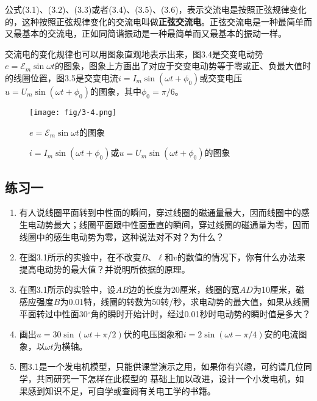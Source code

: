 公式(3.1)、(3.2)、(3.3)或者(3.4)、(3.5)、(3.6)，表示交流电是按照正弦规律变化的，这种按照正弦规律变化的交流电叫做\textbf{正弦交流电}。正弦交流电是一种最简单而又最基本的交流电，正如同简谐振动是一种最简单而又最基本的振动一样。
	
	
交流电的变化规律也可以用图象直观地表示出来，图3.4是交变电动势$e=\mathcal{E}_m \sin \omega t$的图象，图象上方画出了对应于交变电动势等于零或正、负最大值时的线圈位置，图3.5是交变电流$i=I_m\sin(\omega t+\phi_0)$或交变电压 $u=U_m\sin(\omega t+\phi_0)$的图象，其中$\phi_0=\pi/6$。
\begin{figure}[htp]\centering
\texttt{[image: fig/3-4.png]}
\caption{$e=\mathcal{E}_m \sin \omega t$的图象}
\end{figure}
\begin{figure}[htp]\centering
{}
\caption{$i=I_m\sin(\omega t+\phi_0)$或$u=U_m\sin(\omega t+\phi_0)$的图象}
\end{figure}



\subsection*{练习一}
\begin{enumerate}
    \item 有人说线圈平面转到中性面的瞬间，穿过线圈的磁通量最大，因而线圈中的感生电动势最大；线圈平面跟中性面垂直的瞬间，穿过线圈的磁通量为零，因而线圈中的感生电动势为零，这种说法对不对？为什么？
    \item 在图3.1所示的实验中，在不改变$B$、$\ell$和$v$的数值的情况下，你有什么办法来提高电动势的最大值？并说明所依据的原理。
    \item 在图3.1所示的实验中，设$AB$边的长度为20厘米，线圈的宽$AD$为10厘米，磁感应强度$B$为0.01特，线圈的转数为50转/秒，求电动势的最大值，如果从线圈平面转过中性面30$^\circ$角的瞬时开始计时，经过0.01秒时电动势的瞬时值是多大？
    \item 画出$u=30\sin(\omega t+\pi/2)$伏的电压图象和$i=2\sin(\omega t-\pi/4)$安的电流图象，以$\omega t$为横轴。
    \item 图3.1是一个发电机模型，只能供课堂演示之用，如果你有兴趣，可约请几位同学，共同研究一下怎样在此模型的	
	基础上加以改进，设计一个小发电机，如果感到知识不足，可自学或查阅有关电工学的书籍。
\end{enumerate}


